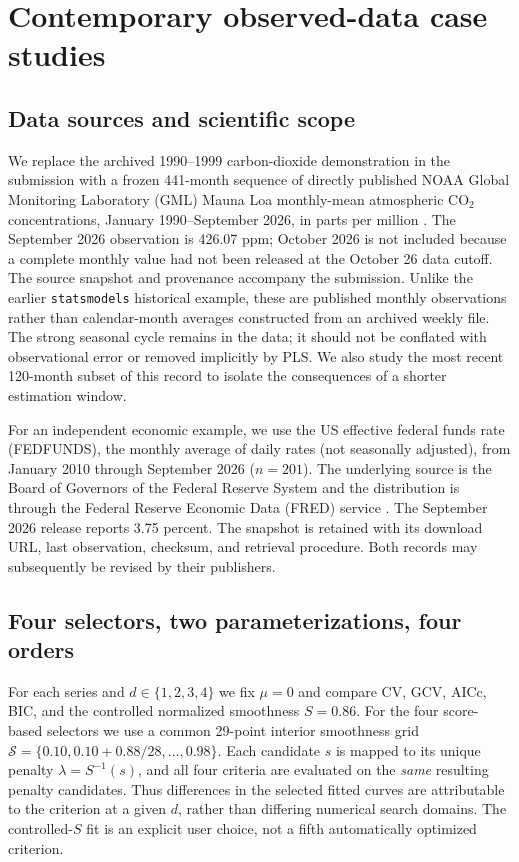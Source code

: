 \section{Contemporary observed-data case studies}\label{sec:updated-case-studies}

\subsection{Data sources and scientific scope}
We replace the archived 1990--1999 carbon-dioxide demonstration in
the submission with a frozen 441-month sequence of directly
published NOAA Global Monitoring Laboratory (GML) Mauna Loa
monthly-mean atmospheric $\mathrm{CO}_2$ concentrations,
January 1990--September 2026, in parts per million
\cite{noaa2026mlo}. The September 2026 observation is
426.07 ppm; October 2026 is not included because a complete
monthly value had not been released at the October 26 data cutoff.
The source snapshot and provenance accompany the submission.
Unlike the earlier \texttt{statsmodels} historical example, these
are published monthly observations rather than calendar-month
averages constructed from an archived weekly file.
The strong seasonal cycle remains in the data; it should not be
conflated with observational error or removed implicitly by PLS.
We also study the most recent 120-month subset of this record to
isolate the consequences of a shorter estimation window.

For an independent economic example, we use the US effective federal funds rate (FEDFUNDS), the
monthly average of daily rates (not seasonally adjusted), from January 2010 through September 2026 ($n=201$).
The underlying source is the Board of Governors of the Federal Reserve System
and the distribution is through the Federal Reserve Economic
Data (FRED) service \cite{fred2026fedfunds}. The September 2026
release reports 3.75 percent. The snapshot is retained with its
download URL, last observation, checksum, and retrieval procedure.
Both records may subsequently be revised by their publishers.

\subsection{Four selectors, two parameterizations, four orders}
For each series and $d\in\{1,2,3,4\}$ we fix $\mu=0$ and compare
CV, GCV, AICc, BIC, and the controlled normalized smoothness
$S=0.86$. For the four score-based selectors we use a common
29-point interior smoothness grid
$\mathcal S=\{0.10,0.10+0.88/28,\ldots,0.98\}$.
Each candidate $s$ is mapped to its unique penalty
$\lambda=S^{-1}(s)$, and all four criteria are evaluated on the
\emph{same} resulting penalty candidates. Thus differences in
the selected fitted curves are attributable to the criterion
at a given $d$, rather than differing numerical search domains.
The controlled-$S$ fit is an explicit user choice, not a
fifth automatically optimized criterion.

